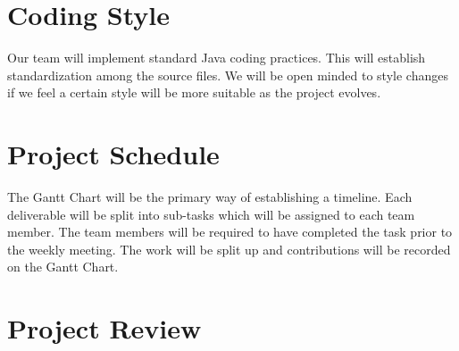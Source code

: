 \documentclass{article}
\begin{document}
\section{Coding Style}
Our team will implement standard Java coding practices. This will establish standardization among the source files. We will be open minded to style changes if we feel a certain style will be more suitable as the project evolves.

\section{Project Schedule}
The Gantt Chart will be the primary way of establishing a timeline. Each deliverable will be split into sub-tasks which will be assigned to each team member. The team members will be required to have completed the task prior to the weekly meeting. The work will be split up and contributions will be recorded on the Gantt Chart.



\section{Project Review}
\end{document}
